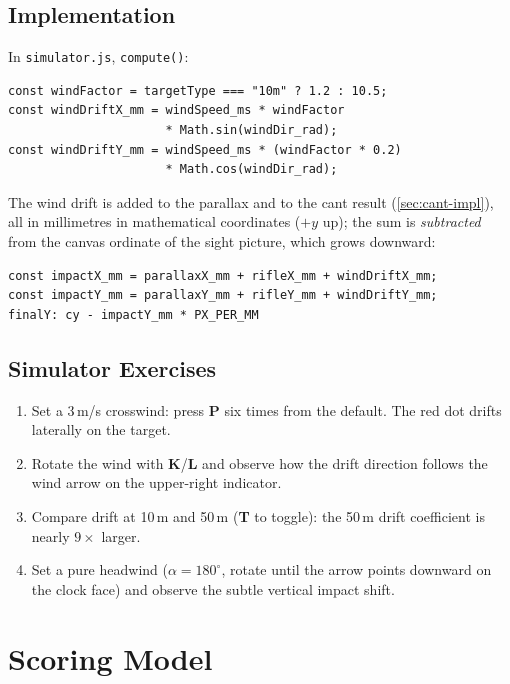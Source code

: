 \documentclass[11pt]{article}
\newcommand{\code}[1]{\texttt{#1}}
\newcommand{\file}[1]{\texttt{#1}}
\newcommand{\key}[1]{\textsf{\textbf{#1}}}
\begin{document}
\subsection{Implementation}
In \file{simulator.js}, \code{compute()}:
\begin{lstlisting}
const windFactor = targetType === "10m" ? 1.2 : 10.5;
const windDriftX_mm = windSpeed_ms * windFactor
                      * Math.sin(windDir_rad);
const windDriftY_mm = windSpeed_ms * (windFactor * 0.2)
                      * Math.cos(windDir_rad);
\end{lstlisting}
The wind drift is added to the parallax and to the cant result
(\cref{sec:cant-impl}), all in millimetres in mathematical coordinates
($+y$ up); the sum is \emph{subtracted} from the canvas ordinate of the
sight picture, which grows downward:
\begin{lstlisting}
const impactX_mm = parallaxX_mm + rifleX_mm + windDriftX_mm;
const impactY_mm = parallaxY_mm + rifleY_mm + windDriftY_mm;
finalY: cy - impactY_mm * PX_PER_MM
\end{lstlisting}

\subsection{Simulator Exercises}
\begin{enumerate}[nosep]
  \item Set a 3\,m/s crosswind: press \key{P} six times from the
        default.  The red dot drifts laterally on the target.
  \item Rotate the wind with \key{K}/\key{L} and observe how the
        drift direction follows the wind arrow on the upper-right
        indicator.
  \item Compare drift at 10\,m and 50\,m (\key{T} to toggle):
        the 50\,m drift coefficient is nearly $9\times$ larger.
  \item Set a pure headwind ($\alpha = 180^\circ$, rotate until
        the arrow points downward on the clock face) and observe the
        subtle vertical impact shift.
\end{enumerate}


\section{Scoring Model}\label{sec:scoring}
\end{document}

